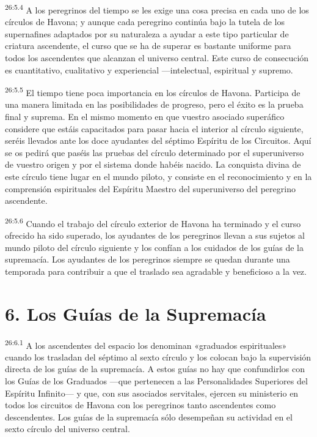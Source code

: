 \par
\textsuperscript{26:5.4} A los peregrinos del tiempo se les exige una cosa precisa en cada uno de los círculos de Havona; y aunque cada peregrino continúa bajo la tutela de los supernafines adaptados por su naturaleza a ayudar a este tipo particular de criatura ascendente, el curso que se ha de superar es bastante uniforme para todos los ascendentes que alcanzan el universo central. Este curso de consecución es cuantitativo, cualitativo y experiencial ---intelectual, espiritual y supremo.

\par
\textsuperscript{26:5.5} El tiempo tiene poca importancia en los círculos de Havona. Participa de una manera limitada en las posibilidades de progreso, pero el éxito es la prueba final y suprema. En el mismo momento en que vuestro asociado superáfico considere que estáis capacitados para pasar hacia el interior al círculo siguiente, seréis llevados ante los doce ayudantes del séptimo Espíritu de los Circuitos. Aquí se os pedirá que paséis las pruebas del círculo determinado por el superuniverso de vuestro origen y por el sistema donde habéis nacido. La conquista divina de este círculo tiene lugar en el mundo piloto, y consiste en el reconocimiento y en la comprensión espirituales del Espíritu Maestro del superuniverso del peregrino ascendente.

\par
\textsuperscript{26:5.6} Cuando el trabajo del círculo exterior de Havona ha terminado y el curso ofrecido ha sido superado, los ayudantes de los peregrinos llevan a sus sujetos al mundo piloto del círculo siguiente y los confían a los cuidados de los guías de la supremacía. Los ayudantes de los peregrinos siempre se quedan durante una temporada para contribuir a que el traslado sea agradable y beneficioso a la vez.

\section*{6. Los Guías de la Supremacía}
\par
\textsuperscript{26:6.1} A los ascendentes del espacio los denominan «graduados espirituales» cuando los trasladan del séptimo al sexto círculo y los colocan bajo la supervisión directa de los guías de la supremacía. A estos guías no hay que confundirlos con los Guías de los Graduados ---que pertenecen a las Personalidades Superiores del Espíritu Infinito--- y que, con sus asociados servitales, ejercen su ministerio en todos los circuitos de Havona con los peregrinos tanto ascendentes como descendentes. Los guías de la supremacía sólo desempeñan su actividad en el sexto círculo del universo central.


